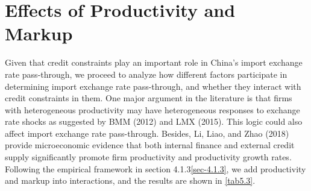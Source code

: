 \section{Effects of Productivity and Markup}

Given that credit constraints play an important role in China's import exchange rate pass-through, we proceed to analyze how different factors participate in determining import exchange rate pass-through, and whether they interact with credit constraints in them. One major argument in the literature is that firms with heterogeneous productivity may have heterogeneous responses to exchange rate shocks as suggested by BMM (2012)\cite{bmm} and LMX (2015)\cite{lmx2015}. This logic could also affect import exchange rate pass-through. Besides, Li, Liao, and Zhao (2018)\cite{llz2018} provide microeconomic evidence that both internal finance and external credit supply significantly promote firm productivity and productivity growth rates. Following the empirical framework in section 4.1.3\ref{sec-4.1.3}, we add productivity and markup into interactions, and the results are shown in \ref{tab5.3}.

